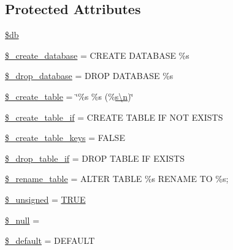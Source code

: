 \subsection*{Protected Attributes}
\begin{DoxyCompactItemize}
\item 
\mbox{\hyperlink{class_c_i___d_b__forge_a1fa3127fc82f96b1436d871ef02be319}{\$db}}
\item 
\mbox{\hyperlink{class_c_i___d_b__forge_acd23c9a8735806155f1a5d0a87c151f2}{\$\+\_\+create\+\_\+database}} = \textquotesingle{}C\+R\+E\+A\+TE D\+A\+T\+A\+B\+A\+SE \%s\textquotesingle{}
\item 
\mbox{\hyperlink{class_c_i___d_b__forge_a8305b12fc17f6f87778260ebdff287b4}{\$\+\_\+drop\+\_\+database}} = \textquotesingle{}D\+R\+OP D\+A\+T\+A\+B\+A\+SE \%s\textquotesingle{}
\item 
\mbox{\hyperlink{class_c_i___d_b__forge_a5950510a854f546e14f781b079a0a2b0}{\$\+\_\+create\+\_\+table}} = \char`\"{}\%s \%s (\%\mbox{\hyperlink{cli_2error__php_8php_a2e6b16bbc42094e4c51ade3c10afdcf1}{s\textbackslash{}n}})\char`\"{}
\item 
\mbox{\hyperlink{class_c_i___d_b__forge_a2f6484fcb8d1dc3eef67a637227cd583}{\$\+\_\+create\+\_\+table\+\_\+if}} = \textquotesingle{}C\+R\+E\+A\+TE T\+A\+B\+LE IF N\+OT E\+X\+I\+S\+TS\textquotesingle{}
\item 
\mbox{\hyperlink{class_c_i___d_b__forge_a73e07acdd35c948ad353903c2827af6e}{\$\+\_\+create\+\_\+table\+\_\+keys}} = F\+A\+L\+SE
\item 
\mbox{\hyperlink{class_c_i___d_b__forge_a92a8a9145a7fc91e252e58d019373581}{\$\+\_\+drop\+\_\+table\+\_\+if}} = \textquotesingle{}D\+R\+OP T\+A\+B\+LE IF E\+X\+I\+S\+TS\textquotesingle{}
\item 
\mbox{\hyperlink{class_c_i___d_b__forge_a1a649e7cf9de16bcf932977b18bc91de}{\$\+\_\+rename\+\_\+table}} = \textquotesingle{}A\+L\+T\+ER T\+A\+B\+LE \%s R\+E\+N\+A\+ME TO \%s;\textquotesingle{}
\item 
\mbox{\hyperlink{class_c_i___d_b__forge_aae977ae6d61fa183f0b25422b6ddc31c}{\$\+\_\+unsigned}} = \mbox{\hyperlink{constants_8php_ae04a3efe6aa42044f803ee90c2277846}{T\+R\+UE}}
\item 
\mbox{\hyperlink{class_c_i___d_b__forge_ae58fe6a5104d4a069a49b27533ce808f}{\$\+\_\+null}} = \textquotesingle{}\textquotesingle{}
\item 
\mbox{\hyperlink{class_c_i___d_b__forge_aa119e1b4e3d00f47a7b83b7066087915}{\$\+\_\+default}} = \textquotesingle{} D\+E\+F\+A\+U\+LT \textquotesingle{}
\end{DoxyCompactItemize}


